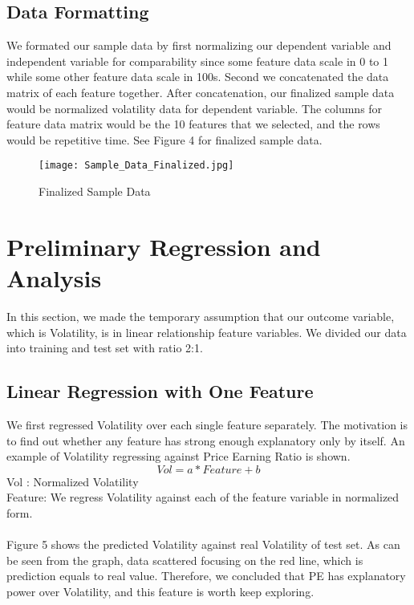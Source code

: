 \documentclass[a4paper]{article}
\begin{document}
\subsection{Data Formatting}
We formated our sample data by first normalizing our dependent variable and independent variable for comparability since some feature data scale in 0 to 1 while some other feature data scale in 100s. Second we concatenated the data matrix of each feature together. After concatenation, our finalized sample data would be normalized volatility data for dependent variable. The columns for feature data matrix would be the 10 features that we selected, and the rows would be repetitive time. See Figure 4 for finalized sample data.

\begin{figure}[h]
\centering
\texttt{[image: Sample\_Data\_Finalized.jpg]}
\caption{\label{fig:sample final data}Finalized Sample Data}
\end{figure}

\section{Preliminary Regression and Analysis}
\label{sec:theory}
In this section, we made the temporary assumption that our outcome variable, which is Volatility, is in linear relationship feature variables. We divided our data into training and test set with ratio 2:1.

\subsection{Linear Regression with One Feature}
We first regressed Volatility over each single feature separately. The motivation is to find out whether any feature has strong enough explanatory only by itself. An example of Volatility regressing against Price Earning Ratio is shown.
\begin{equation}
Vol = a*Feature+b
\end{equation}
Vol : Normalized Volatility
\\Feature: We regress Volatility against each of the feature variable in normalized form.
\\\\Figure 5 shows the predicted Volatility against real Volatility of test set. As can be seen from the graph, data scattered focusing on the red line, which is prediction equals to real value. Therefore, we concluded that PE has explanatory power over Volatility, and this feature is worth keep exploring.
\end{document}
